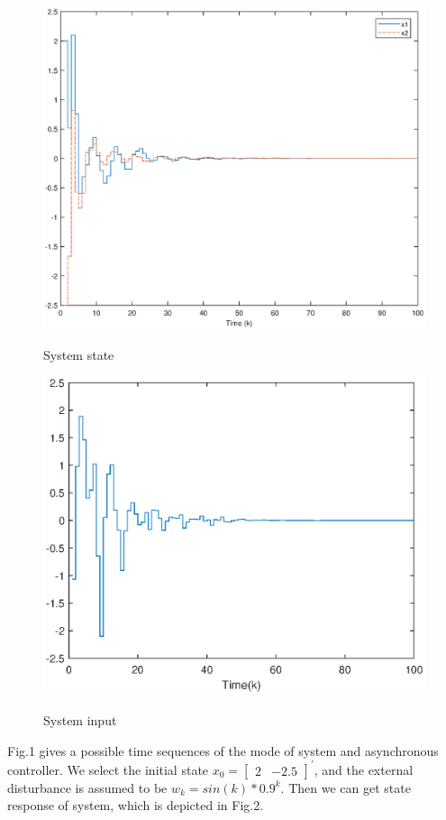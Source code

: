 \documentclass[conference]{IEEEtran}
\begin{document}
\begin{figure}[!htb]
	\centering\includegraphics[scale=0.4]{./simulink/state_new.eps}\\
	\caption{System state}
	\label{fig.2}
\end{figure}
\begin{figure}[!htb]
	\centering\includegraphics[scale=0.59]{./simulink/u_k3.eps}\\
	\caption{System input}
	\label{fig.3}
\end{figure}
Fig.1 gives a possible time sequences of the mode of system and asynchronous controller. We select the initial state $x_{0}=\begin{bmatrix}
	2&-2.5
\end{bmatrix}^{'}$, and the external disturbance is assumed to be $w_{k} = sin(k)*0.9^{k}$. Then we can get state response of system, which is depicted in Fig.2.
\end{document}
